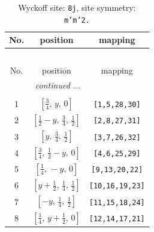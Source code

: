 \documentclass[fleqn,8pt]{jsarticle}
\begin{document}
\begin{longtable}{ccc}
\caption{Wyckoff site: {\tt 8j}, site symmetry: {\tt m'm'2.}}
 \\
 \hline \hline
No. & position & mapping \\ \hline \endfirsthead

\multicolumn{2}{l}{\tablename\ \thetable{}} \\
 \hline \hline
No. & position & mapping \\ \hline \endhead

 \hline \hline
\multicolumn{2}{r}{\footnotesize\it continued ...} \\ \endfoot

 \hline \hline
\multicolumn{2}{r}{} \\ \endlastfoot

1 & $\left[ \frac{3}{4},\, y,\, 0 \right]$ & {\tt [1,5,28,30]} \\ \hline
2 & $\left[ \frac{1}{2} - y,\, \frac{3}{4},\, \frac{1}{2} \right]$ & {\tt [2,8,27,31]} \\ \hline
3 & $\left[ y,\, \frac{3}{4},\, \frac{1}{2} \right]$ & {\tt [3,7,26,32]} \\ \hline
4 & $\left[ \frac{3}{4},\, \frac{1}{2} - y,\, 0 \right]$ & {\tt [4,6,25,29]} \\ \hline
5 & $\left[ \frac{1}{4},\, - y,\, 0 \right]$ & {\tt [9,13,20,22]} \\ \hline
6 & $\left[ y + \frac{1}{2},\, \frac{1}{4},\, \frac{1}{2} \right]$ & {\tt [10,16,19,23]} \\ \hline
7 & $\left[ - y,\, \frac{1}{4},\, \frac{1}{2} \right]$ & {\tt [11,15,18,24]} \\ \hline
8 & $\left[ \frac{1}{4},\, y + \frac{1}{2},\, 0 \right]$ & {\tt [12,14,17,21]} \\
\end{longtable}
\renewcommand{\arraystretch}{1.2}
\end{document}
